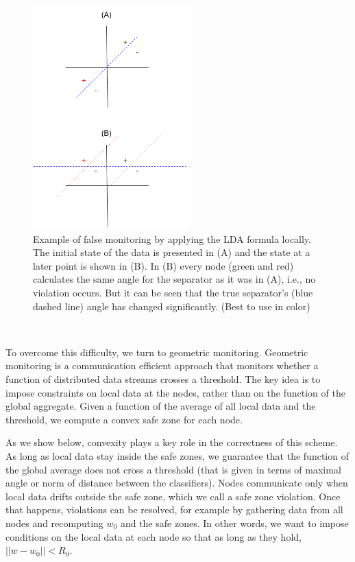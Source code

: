 \documentclass{sig-alternate-05-2015}
\begin{document}
\begin{figure}[h]
\centering
\includegraphics[width=60mm]{NegativeExample.png}
\caption{Example of false monitoring by applying the LDA formula locally. The
initial state of the data is presented in (A) and the state at a later point
is shown in (B). In (B) every node (green and red) calculates the same angle
for the separator as it was in (A), i.e., no violation occurs. But it can be
seen that the true separator's (blue dashed line) angle has changed
significantly. (Best to use in color)}
\label{NegativeExampl}
\end{figure}


\\\par To overcome this difficulty, we turn to geometric monitoring. Geometric
monitoring \cite{keren2014geometric, keren2012shape} is a communication
efficient approach that monitors whether a function of distributed
data streams crosses a threshold. The key idea is to
impose constraints on local data at the nodes, rather than
on the function of the global aggregate. Given a function of
the average of all local data and the threshold, we compute a
convex safe zone for each node. 
\\\par As we show below, convexity
plays a key role in the correctness of this scheme. As long
as local data stay inside the safe zones, we guarantee that
the function of the global average does not cross a threshold (that is given
in terms of maximal angle or norm of distance between the classifiers).
Nodes communicate only when local data drifts outside the
safe zone, which we call a safe zone violation. Once that
happens, violations can be resolved, for example by gathering
data from all nodes and recomputing $w_0$ and the safe zones.
In other words, we want to impose conditions on the local
data at each node so that as long as they hold, $||w-w_0||<R_0$.
\end{document}
